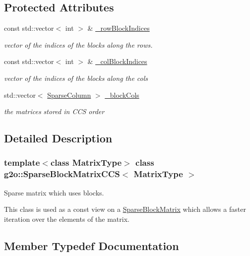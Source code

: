 \subsection*{Protected Attributes}
\begin{DoxyCompactItemize}
\item 
const std\+::vector$<$ int $>$ \& \mbox{\hyperlink{classg2o_1_1_sparse_block_matrix_c_c_s_afabda9a2efe5ea9efb5a1e5312f6e307}{\+\_\+row\+Block\+Indices}}
\begin{DoxyCompactList}\small\item\em vector of the indices of the blocks along the rows. \end{DoxyCompactList}\item 
const std\+::vector$<$ int $>$ \& \mbox{\hyperlink{classg2o_1_1_sparse_block_matrix_c_c_s_ae31426bfb6b31bd0fd72de2e18dd5a35}{\+\_\+col\+Block\+Indices}}
\begin{DoxyCompactList}\small\item\em vector of the indices of the blocks along the cols \end{DoxyCompactList}\item 
std\+::vector$<$ \mbox{\hyperlink{classg2o_1_1_sparse_block_matrix_c_c_s_a4fc5dfe0a9ff9bd62065ca4b17f25bc1}{Sparse\+Column}} $>$ \mbox{\hyperlink{classg2o_1_1_sparse_block_matrix_c_c_s_ab6b173607380a367cc1cd67442c1c3e2}{\+\_\+block\+Cols}}
\begin{DoxyCompactList}\small\item\em the matrices stored in C\+CS order \end{DoxyCompactList}\end{DoxyCompactItemize}


\subsection{Detailed Description}
\subsubsection*{template$<$class Matrix\+Type$>$\newline
class g2o\+::\+Sparse\+Block\+Matrix\+C\+C\+S$<$ Matrix\+Type $>$}

Sparse matrix which uses blocks. 

This class is used as a const view on a \mbox{\hyperlink{classg2o_1_1_sparse_block_matrix}{Sparse\+Block\+Matrix}} which allows a faster iteration over the elements of the matrix. 

\subsection{Member Typedef Documentation}
\mbox{\label{classg2o_1_1_sparse_block_matrix_c_c_s_a4fc5dfe0a9ff9bd62065ca4b17f25bc1}} 
